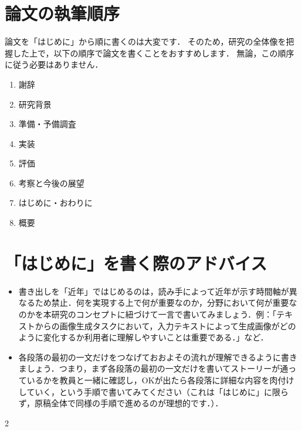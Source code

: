 \section{論文の執筆順序}
論文を「はじめに」から順に書くのは大変です．
そのため，研究の全体像を把握した上で，以下の順序で論文を書くことをおすすめします．
無論，この順序に従う必要はありません．

\begin{enumerate}
    \item 謝辞
    \item 研究背景
    \item 準備・予備調査
    \item 実装
    \item 評価
    \item 考察と今後の展望
    \item はじめに・おわりに
    \item 概要
\end{enumerate}

\section{「はじめに」を書く際のアドバイス}
\begin{itemize}
    \item 書き出しを「近年」ではじめるのは，読み手によって近年が示す時間軸が異なるため禁止．何を実現する上で何が重要なのか，分野において何が重要なのかを本研究のコンセプトに紐づけて一言で書いてみましょう．例：「テキストからの画像生成タスクにおいて，入力テキストによって生成画像がどのように変化するか利用者に理解しやすいことは重要である．」など．
    \item 各段落の最初の一文だけをつなげておおよその流れが理解できるように書きましょう．つまり，まず各段落の最初の一文だけを書いてストーリーが通っているかを教員と一緒に確認し，OKが出たら各段落に詳細な内容を肉付けしていく，という手順で書いてみてください（これは「はじめに」に限らず，原稿全体で同様の手順で進めるのが理想的です．）．
\end{itemize}2